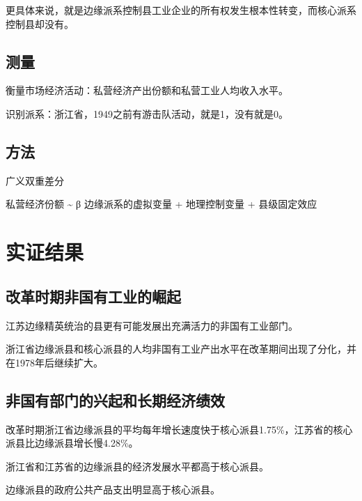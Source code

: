 \documentclass[
]{book}
\begin{document}
更具体来说，就是边缘派系控制县工业企业的所有权发生根本性转变，而核心派系控制县却没有。

\hypertarget{ux6d4bux91cf}{%
\section{测量}\label{ux6d4bux91cf}}

衡量市场经济活动：私营经济产出份额和私营工业人均收入水平。

识别派系：浙江省，1949之前有游击队活动，就是1，没有就是0。

\hypertarget{ux65b9ux6cd5}{%
\section{方法}\label{ux65b9ux6cd5}}

广义双重差分

私营经济份额 \textasciitilde{} β 边缘派系的虚拟变量 + 地理控制变量 + 县级固定效应

\hypertarget{ux5b9eux8bc1ux7ed3ux679c}{%
\chapter{实证结果}\label{ux5b9eux8bc1ux7ed3ux679c}}

\hypertarget{ux6539ux9769ux65f6ux671fux975eux56fdux6709ux5de5ux4e1aux7684ux5d1bux8d77}{%
\section{改革时期非国有工业的崛起}\label{ux6539ux9769ux65f6ux671fux975eux56fdux6709ux5de5ux4e1aux7684ux5d1bux8d77}}

江苏边缘精英统治的县更有可能发展出充满活力的非国有工业部门。

浙江省边缘派县和核心派县的人均非国有工业产出水平在改革期间出现了分化，并在1978年后继续扩大。

\hypertarget{ux975eux56fdux6709ux90e8ux95e8ux7684ux5174ux8d77ux548cux957fux671fux7ecfux6d4eux7ee9ux6548}{%
\section{非国有部门的兴起和长期经济绩效}\label{ux975eux56fdux6709ux90e8ux95e8ux7684ux5174ux8d77ux548cux957fux671fux7ecfux6d4eux7ee9ux6548}}

改革时期浙江省边缘派县的平均每年增长速度快于核心派县1.75\%，江苏省的核心派县比边缘派县增长慢4.28\%。

浙江省和江苏省的边缘派县的经济发展水平都高于核心派县。

边缘派县的政府公共产品支出明显高于核心派县。

  
\end{document}
